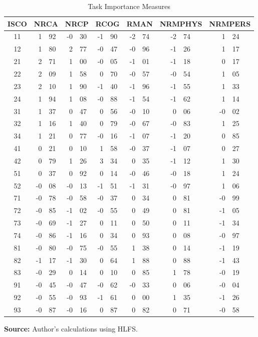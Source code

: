 \begin{table}[H]
\caption{\label{tab:Task-Importance-Measures}Task Importance Measures}

\begin{centering}
\begin{tabular}{cr@{\extracolsep{0pt}.}lr@{\extracolsep{0pt}.}lr@{\extracolsep{0pt}.}lr@{\extracolsep{0pt}.}lr@{\extracolsep{0pt}.}lr@{\extracolsep{0pt}.}l}
\toprule 
ISCO & \multicolumn{2}{c}{NRCA} & \multicolumn{2}{c}{NRCP} & \multicolumn{2}{c}{RCOG} & \multicolumn{2}{c}{RMAN} & \multicolumn{2}{c}{NRMPHYS} & \multicolumn{2}{c}{NRMPERS}\tabularnewline
\midrule 
11 & 1&92 & -0&30 & -1&90 & -2&74 & -2&74 & 1&24\tabularnewline
12 & 1&80 & 2&77 & -0&47 & -0&96 & -1&26 & 1&17\tabularnewline
21 & 2&71 & 1&00 & -0&05 & -1&01 & -1&18 & 0&17\tabularnewline
22 & 2&09 & 1&58 & 0&70 & -0&57 & -0&54 & 1&05\tabularnewline
23 & 2&10 & 1&90 & -1&40 & -1&96 & -1&55 & 1&33\tabularnewline
24 & 1&94 & 1&08 & -0&88 & -1&54 & -1&62 & 1&14\tabularnewline
31 & 1&37 & 0&47 & 0&56 & -0&10 & 0&06 & -0&02\tabularnewline
32 & 1&16 & 1&40 & 0&79 & -0&67 & -0&83 & 1&25\tabularnewline
34 & 1&21 & 0&77 & -0&16 & -1&07 & -1&20 & 0&85\tabularnewline
41 & 0&21 & 0&10 & 1&58 & -0&37 & -1&07 & 0&27\tabularnewline
42 & 0&79 & 1&26 & 3&34 & 0&35 & -1&12 & 1&30\tabularnewline
51 & 0&37 & 0&92 & 0&14 & -0&46 & -0&18 & 1&24\tabularnewline
52 & -0&08 & -0&13 & -1&51 & -1&31 & -0&97 & 1&06\tabularnewline
71 & -0&78 & -0&58 & -0&37 & 0&34 & 0&81 & -0&99\tabularnewline
72 & -0&85 & -1&02 & -0&55 & 0&49 & 0&81 & -1&05\tabularnewline
73 & -0&69 & -1&27 & 0&11 & 0&50 & 0&11 & -1&34\tabularnewline
74 & -0&86 & -1&16 & 0&34 & 0&93 & 0&08 & -0&97\tabularnewline
81 & -0&80 & -0&75 & -0&55 & 1&38 & 0&14 & -1&19\tabularnewline
82 & -1&17 & -1&30 & 0&64 & 1&88 & 0&88 & -1&43\tabularnewline
83 & -0&29 & 0&14 & 0&10 & 0&85 & 1&78 & -0&19\tabularnewline
91 & -0&45 & -0&47 & -0&62 & -0&33 & 0&06 & -0&04\tabularnewline
92 & -0&55 & -0&93 & -1&61 & 0&00 & 1&35 & -1&26\tabularnewline
93 & -0&87 & -0&16 & 0&87 & 0&82 & 0&71 & -0&58\tabularnewline
\bottomrule
\end{tabular}
\par\end{centering}
\medskip

\textbf{Source: }Author's calculations using HLFS.
\end{table}
